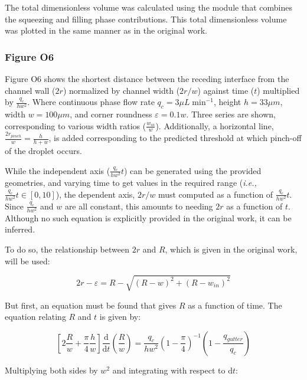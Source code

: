 The total dimensionless volume was calculated using the module that combines the squeezing and filling
phase contributions. This total dimensionless volume was plotted
in the same manner as in the original work.

\subsubsection{Figure O6}

Figure O6 shows the shortest distance between the receding interface from the channel wall ($2r$) normalized
by channel width ($2r/w$) against time ($t$) multiplied by $\frac{q_c}{hw^2}$. Where continuous phase
flow rate $q_c = 3{\mu}L\;\mathrm{min}^{-1}$, height $h=33{\mu}m$, width $w=100{\mu}m$, and corner roundness
$\varepsilon=0.1w$. Three series are shown, corresponding to various width ratios ($\frac{w_{in}}{w}$).
Additionally, a horizontal line, $\frac{2r_{pinch}}{w}=\frac{h}{h+w}$, is added corresponding to
the predicted threshold at which pinch-off of the droplet occurs.

While the independent axis ($\frac{q_c}{hw^2}t$) can be generated using the provided geometries, and varying
time to get values in the required range (\emph{i.e.,} $\frac{q_c}{hw^2}t \in [0,10]$), the dependent axis,
$2r/w$ must computed as a function of $\frac{q_c}{hw^2}t$. Since $\frac{q_c}{hw^2}$ and $w$ are all constant,
this amounts to needing $2r$ as a function of $t$. Although no such equation
is explicitly provided in the original work, it can be inferred.

To do so, the relationship between $2r$ and $R$, which is given in the original work, will be used:

\begin{equation}
  2r - \varepsilon = R - \sqrt{\left(R - w\right)^2 + \left(R - w_{in}\right)^2}
\end{equation}

\noindent But first, an equation must be found that gives $R$ as a function of time. The equation
relating $R$ and $t$ is given by:

\begin{equation}
  \left[2\frac{R}{w} + \frac{\pi}{4}\frac{h}{w}\right]
  \frac{\mathrm{d}}{\mathrm{d}t}\left(\frac{R}{w}\right) = 
  \frac{q_c}{hw^2} \left(1-\frac{\pi}{4}\right)^{-1}
  \left(1-\frac{q_{gutter}}{q_c}\right)
\end{equation}

\noindent Multiplying both sides by $w^2$ and integrating with respect to $\mathrm{d}t$:

